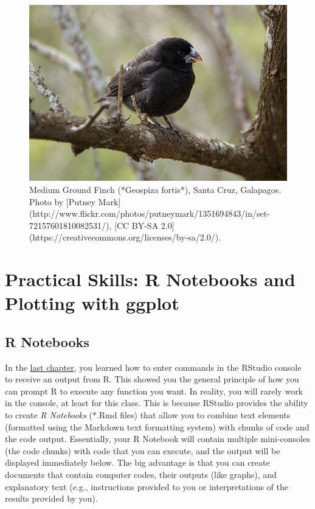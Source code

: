 \documentclass[
]{book}
\begin{document}
\begin{figure}
\includegraphics[width=1\linewidth]{images/Geospiza_fortis} \caption{Medium Ground Finch (*Geospiza fortis*), Santa Cruz, Galapagos. Photo by [Putney Mark](http://www.flickr.com/photos/putneymark/1351694843/in/set-72157601810082531/), [CC BY-SA 2.0](https://creativecommons.org/licenses/by-sa/2.0/).}\label{fig:fortis}
\end{figure}

\hypertarget{practical-skills-r-notebooks-and-plotting-with-ggplot}{%
\section{Practical Skills: R Notebooks and Plotting with ggplot}\label{practical-skills-r-notebooks-and-plotting-with-ggplot}}

\hypertarget{r-notebooks}{%
\subsection{R Notebooks}\label{r-notebooks}}

In the \href{what-evolution-is.html\#r}{last chapter}, you learned how to enter commands in the RStudio console to receive an output from R. This showed you the general principle of how you can prompt R to execute any function you want. In reality, you will rarely work in the console, at least for this class. This is because RStudio provides the ability to create \emph{R Notebooks} (*.Rmd files) that allow you to combine text elements (formatted using the Markdown text formatting system) with chunks of code and the code output. Essentially, your R Notebook will contain multiple mini-consoles (the code chunks) with code that you can execute, and the output will be displayed immediately below. The big advantage is that you can create documents that contain computer codes, their outputs (like graphs), and explanatory text (e.g., instructions provided to you or interpretations of the results provided by you).
\end{document}
